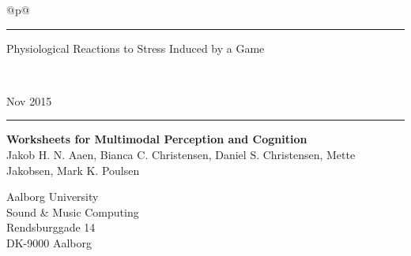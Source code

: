 \def\navnA{Jakob H. N. Aaen}\def\navnB{Bianca C. Christensen}\def\navnC{Daniel S. Christensen}\def\navnD{Mette Jakobsen}\def\navnE{Mark K. Poulsen}
\def\ptitle{Physiological Reactions to Stress Induced by a Game}
\thispagestyle{empty}
\noindent%
\begin{tabular}{@{}p{\textwidth}@{}}
    \rule{\linewidth}{2mm}\vspace{1.5cm}
    \vspace*{-15mm}
    \begin{flushleft}
        \linespread{0.7}
        \fontsize{50}{60}\selectfont\sffamily
			\ptitle
    \end{flushleft} \\[5mm] 
    \raggedright{
        \fontsize{30}{40}\selectfont\sffamily
        Nov 2015\\ \vspace*{1mm}
    }
    \rule{\linewidth}{.7mm}
\end{tabular}
\begin{flushleft}
  {\Huge\sffamily\bfseries
      	Worksheets for Multimodal Perception and Cognition
  }\\
  \vspace{0.2cm}
  {\LARGE\sffamily
	    \navnA, \navnB, \navnC, \navnD, \navnE
  }
\end{flushleft}
\vfill
\begin{flushleft}\sffamily\large
  Aalborg University\\
  Sound \& Music Computing\\
  Rendsburggade 14\\
  DK-9000 Aalborg
\end{flushleft}
